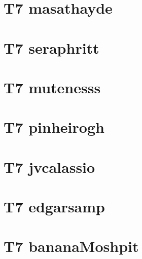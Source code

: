 
\chapter{T7 masathayde}


\chapter{T7 seraphritt}


\chapter{T7 mutenesss}


\chapter{T7 pinheirogh}


\chapter{T7 jvcalassio}


\chapter{T7 edgarsamp}



\chapter{T7 bananaMoshpit}
